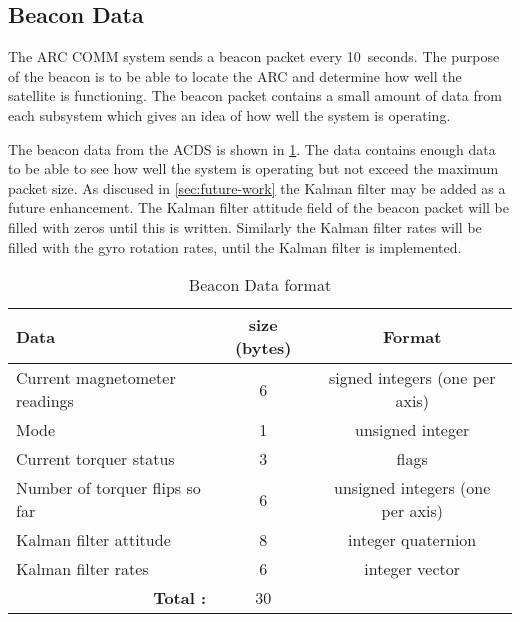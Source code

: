 \subsection{Beacon Data}

The \ac{ARC} \ac{COMM} system sends a beacon packet every 10~seconds. The purpose of the beacon is to be able to locate the \ac{ARC} and determine how well the satellite is functioning. The beacon packet contains a small amount of data from each subsystem which gives an idea of how well the system is operating.

The beacon data from the \ac{ACDS} is shown in \cref{tab:beacondat}. The data contains enough data to be able to see how well the system is operating but not exceed the maximum packet size. As discused in \cref{sec:future-work} the Kalman filter may be added as a future enhancement. The Kalman filter attitude field of the beacon packet will be filled with zeros until this is written. Similarly the Kalman filter rates will be filled with the gyro rotation rates, until the Kalman filter is implemented.

\begin{table}[H]
    \centering
    \caption{Beacon Data format}
    \label{tab:beacondat}
    \begin{tabular}{|l|c|c|}
        \hline
        Data&size (bytes)&Format\\
        \hline
        Current magnetometer readings&6&signed integers (one per axis)\\
        \hline
        Mode&1&unsigned integer\\
        \hline
        Current torquer status&3&flags\\
        \hline
        Number of torquer flips so far & 6 & unsigned integers (one per axis)\\
        \hline
        Kalman filter attitude&8&integer quaternion\\
        \hline
        Kalman filter rates&6&integer vector\\
        \hline
        \multicolumn{1}{|r|}{\bfseries Total :}&30&\\
        \hline
    \end{tabular}
\end{table}

